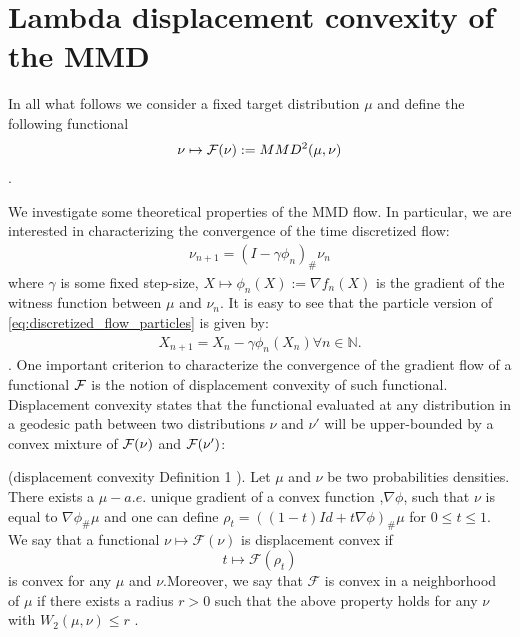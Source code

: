


\section{Lambda displacement convexity of the MMD}
In all what follows we consider a fixed target distribution $\mu$ and define the following functional 
\begin{align}\label{eq:MMD_functional}
	\nu \mapsto {{\mathcal F}}(\nu):=MMD^2(\mu,\nu)
\end{align}. 

We investigate some theoretical properties of the MMD flow. In particular, we are interested in characterizing the convergence of the time discretized flow:
	\begin{align}\label{eq:discretized_flow}
		\nu_{n+1} = (I -\gamma \phi_n)_{\#}\nu_n
	\end{align}
where $\gamma$ is some fixed step-size, $X \mapsto \phi_n(X):=\nabla f_{n}(X)$ is the gradient of the witness function between $\mu$ and $\nu_n$. It is easy to see that the particle version of \ref{eq:discretized_flow_particles} is given by:
\begin{align}
	X_{n+1} = X_n - \gamma \phi_n(X_n) \forall n\in \mathbb{N}.
\end{align}. 
One important criterion to characterize the convergence of the gradient flow of a functional ${{\mathcal F}}$ is the notion of displacement convexity of such functional. Displacement convexity states that the functional evaluated at any distribution in a geodesic path between two distributions $\nu$ and $\nu'$ will be upper-bounded by a convex mixture of ${{\mathcal F}}(\nu)$ and ${{\mathcal F}}(\nu')$:
\begin{definition}
(displacement convexity \cite{Villani:2004} Definition 1 ). Let $\mu$
and $\nu$ be two probabilities densities. There exists a $\mu-a.e.$
unique gradient of a convex function ,$\nabla\phi$, such that $\nu$
is equal to $\nabla\phi_{\#}\mu$ and one can define $\rho_{t}=((1-t)Id+t\nabla\phi)_{\#}\mu$
for $0\leq t\leq1$. We say that a functional $\nu\mapsto\mathcal{F}(\nu)$
is displacement convex if 
\[
t\mapsto\mathcal{F}(\rho_{t})
\]
 is convex for any $\mu$ and $\nu$.Moreover, we say that $\mathcal{F}$
is convex in a neighborhood of $\mu$ if there exists a radius $r>0$
such that the above property holds for any $\nu$ with $W_{2}(\mu,\nu)\leq r$
.
\end{definition}


